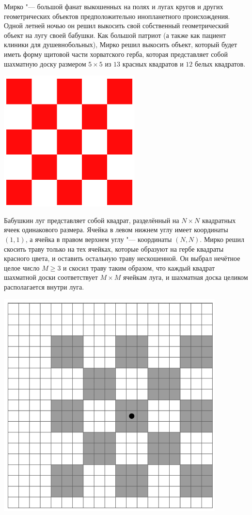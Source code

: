 Мирко "--- большой фанат выкошенных на полях и лугах кругов и других
геометрических объектов предположительно инопланетного происхождения.
Одной летней ночью он решил выкосить свой собственный геометрический
объект на лугу своей бабушки.
Как большой патриот (а также как пациент клиники для душевнобольных),
Мирко решил выкосить объект, который будет иметь форму щитовой части
хорватского герба, которая представляет собой шахматную доску размером
$5 \times 5$ из $13$ красных квадратов и $12$ белых квадратов.

\includegraphics{aliens1.png}


Бабушкин луг представляет собой квадрат, разделённый на $N \times N$
квадратных ячеек одинакового размера.
Ячейка в левом нижнем углу имеет координаты $(1, 1)$, а ячейка в правом
верхнем углу "--- координаты $(N, N)$.
Мирко решил скосить траву только на тех ячейках, которые образуют
на гербе квадраты красного цвета, и оставить остальную траву нескошенной.
Он выбрал нечётное целое число $M \ge 3$ и скосил траву таким образом,
что каждый квадрат шахматной доски соответствует $M \times M$ ячейкам луга,
и шахматная доска целиком располагается внутри луга.

\includegraphics{aliens2.png}

